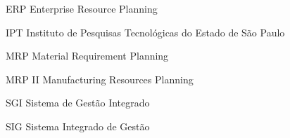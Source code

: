 


{\SingleSpacing
{}
\listoffigures*
\cleardoublepage
}


{\SingleSpacing
{}
\listoftables*
\cleardoublepage
}


\begin{siglas}
  \item[ERP] Enterprise Resource Planning
  \item[IPT] Instituto de Pesquisas Tecnológicas do Estado de São Paulo
  \item[MRP] Material Requirement Planning
  \item[MRP II] Manufacturing Resources Planning
  \item[SGI] Sistema de Gestão Integrado
  \item[SIG] Sistema Integrado de Gestão
\end{siglas}



{\SingleSpacing
{}
\tableofcontents*
\cleardoublepage
}
